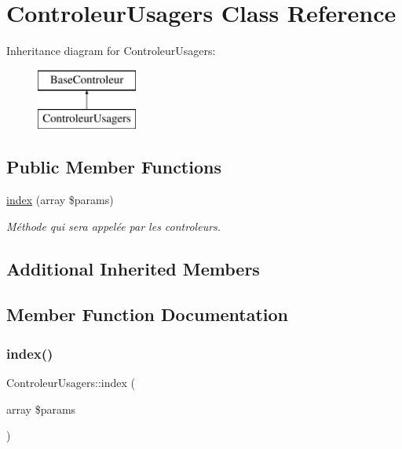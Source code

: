 \hypertarget{class_controleur_usagers}{}\section{Controleur\+Usagers Class Reference}
\label{class_controleur_usagers}
Inheritance diagram for Controleur\+Usagers\+:\begin{figure}[H]
\begin{center}
\leavevmode
\includegraphics[height=2.000000cm]{class_controleur_usagers}
\end{center}
\end{figure}
\subsection*{Public Member Functions}
\begin{DoxyCompactItemize}
\item 
\hyperlink{class_controleur_usagers_a23d029f6b5d0cdeb7c13f63e3af9b377}{index} (array \$params)
\begin{DoxyCompactList}\small\item\em Méthode qui sera appelée par les controleurs. \end{DoxyCompactList}\end{DoxyCompactItemize}
\subsection*{Additional Inherited Members}


\subsection{Member Function Documentation}
\mbox{\label{class_controleur_usagers_a23d029f6b5d0cdeb7c13f63e3af9b377}} 
\subsubsection{\texorpdfstring{index()}{index()}}
{\footnotesize\ttfamily Controleur\+Usagers\+::index (\begin{DoxyParamCaption}\item[{array}]{\$params }\end{DoxyParamCaption})}



